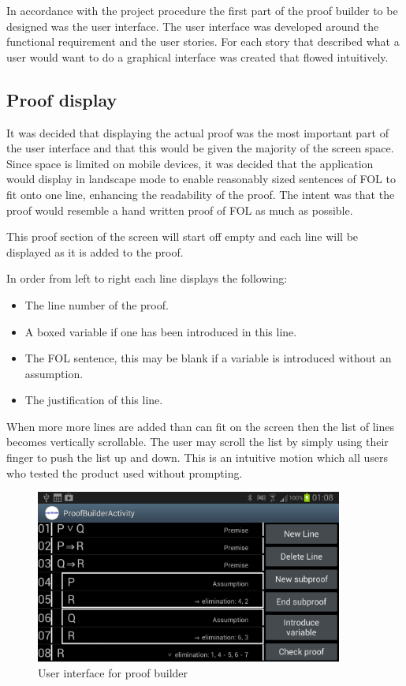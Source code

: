In accordance with the project procedure the first part of the proof builder to be designed was the user interface. The user interface was developed around the functional requirement and the user stories. For each story that described what a user would want to do a graphical interface was created    that flowed intuitively.

\subsection{Proof display}
It was decided that displaying the actual proof was the most important part of the user interface and that this would be given the majority of the screen space. Since space is limited on mobile devices, it was decided that the application would display in landscape mode to enable reasonably sized sentences of FOL to fit onto one line, enhancing the readability of the proof. The intent was that the proof would resemble a hand written proof of FOL as much as possible. 

This proof section of the screen will start off empty and each line will be displayed as it is added to the proof.

In order from left to right each line displays the following:
\begin{itemize}
\item{The line number of the proof.}
\item{A boxed variable if one has been introduced in this line. }
\item{The FOL sentence, this may be blank if a variable is introduced without an assumption.}
\item{The justification of this line.}
\end{itemize}
When more more lines are added than can fit on the screen then the list of lines becomes vertically scrollable. The user may scroll the list by simply using their finger to push the list up and down. This is an intuitive motion which all users who tested the product used without prompting.

\begin{figure}[h!]
\centering
\includegraphics[width=0.9\textwidth]{Images/sampleproof.png}
\caption{User interface for proof builder}
\label{fig:Compilation}
\end{figure}

